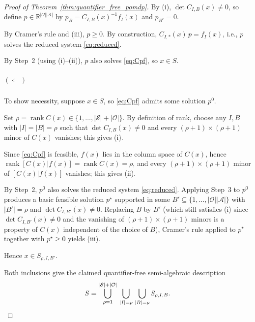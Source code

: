 \documentclass{article}
\theoremstyle{definition}
\theoremstyle{remark}
\newcommand{\rank}{\operatorname{rank}}
\begin{document}
\begin{proof}[Proof of Theorem~\ref{thm:quantifier_free_pomdp}]
By (i), $\det C_{I,B}(x)\ne 0$, so define $p\in\mathbb R^{|\mathcal O||\mathcal A|}$ by $p_B=C_{I,B}(x)^{-1}f_I(x)$ and $p_{B^c}=0$. 

By Cramer's rule and (iii), $p\ge 0$. By construction, $C_{I,*}(x)\,p=f_I(x)$, i.e., $p$ solves the reduced system \eqref{eq:reduced}. 

By Step~2 (using (i)--(ii)), $p$ also solves \eqref{eq:Cpf}, so $x\in S$.

\subparagraph{$\left( \Leftarrow \right)$} To show necessity, suppose $x\in S$, so \eqref{eq:Cpf} admits some solution $p^0$. 

Set $\rho = \rank C(x)\in\{1,\dots,|\mathcal S|+|\mathcal O|\}$. By definition of rank, choose any $I,B$ with $|I|=|B|=\rho$ such that $\det C_{I,B}(x)\ne 0$ and every $(\rho+1)\times(\rho+1)$ minor of $C(x)$ vanishes; this gives (i). 

Since \eqref{eq:Cpf} is feasible, $f(x)$ lies in the column space of $C(x)$, hence $\rank[C(x) |  f(x)]=\rank C(x)=\rho$, and every $(\rho+1)\times(\rho+1)$ minor of $[C(x) |  f(x)]$ vanishes; this gives (ii). 

By Step~2, $p^0$ also solves the reduced system \eqref{eq:reduced}. Applying Step~3 to $p^0$ produces a basic feasible solution $p^\star$ supported in some $B'\subseteq\{1,\dots,|\mathcal O||\mathcal A|\}$ with $|B'|=\rho$ and $\det C_{I,B'}(x)\ne 0$. Replacing $B$ by $B'$ (which still satisfies (i) since $\det C_{I,B'}(x)\ne 0$ and the vanishing of $(\rho+1)\times(\rho+1)$ minors is a property of $C(x)$ independent of the choice of $B$), Cramer's rule applied to $p^\star$ together with $p^\star\ge 0$ yields (iii). 

Hence $x\in S_{\rho,I,B'}$.

Both inclusions give the claimed quantifier-free semi-algebraic description
\[
S = \bigcup_{\rho=1}^{|\mathcal S|+|\mathcal O|}\,\bigcup_{|I|=\rho}\,\bigcup_{|B|=\rho} S_{\rho,I,B}. \qedhere
\]
\end{proof}
\end{document}
